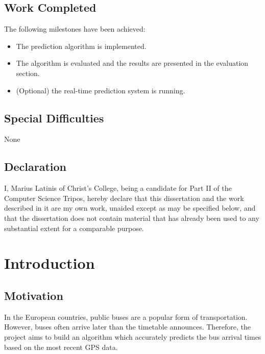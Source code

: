 \documentclass[12pt,a4paper,oneside,openright]{report}
\begin{document}
\section*{Work Completed}

The following milestones have been achieved:

\begin{itemize}
\item The prediction algorithm is implemented.
\item The algorithm is evaluated and the results are presented in the evaluation section.
\item (Optional) the real-time prediction system is running.
\end{itemize}

\section*{Special Difficulties}

None
 
\section*{Declaration}

I, Marius Latinis of Christ's College, being a candidate for Part II of the Computer
Science Tripos, hereby declare that this dissertation and the work described 
in it are my own work, unaided except as may be specified below,
and that the dissertation does not contain material that has already been used to any substantial extent for a comparable purpose.

\bigskip
{}

\medskip
{}

\tableofcontents


\pagestyle{plain}


\chapter{Introduction}

\section{Motivation}

In the European countries, public buses are a popular form of transportation. However,
buses often arrive later than the timetable announces. Therefore, the project aims
to build an algorithm which accurately predicts the bus arrival times based on the
most recent GPS data.
\end{document}
